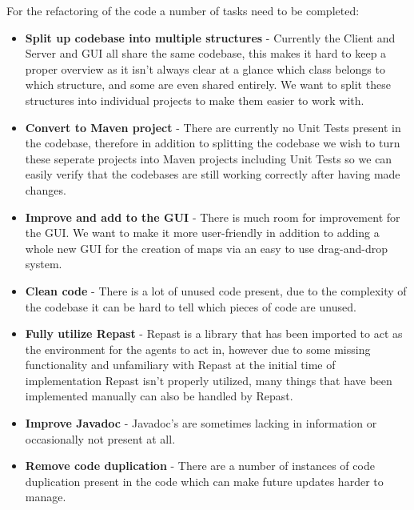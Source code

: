 For the refactoring of the code a number of tasks need to be completed:
\begin{itemize}
\item
\textbf{Split up codebase into multiple structures} - Currently the Client and Server and GUI all share the same codebase, this makes it hard to keep a proper overview as it isn't always clear at a glance which class belongs to which structure, and some are even shared entirely. We want to split these structures into individual projects to make them easier to work with.
\item
\textbf{Convert to Maven project} - There are currently no Unit Tests present in the codebase, therefore in addition to splitting the codebase we wish to turn these seperate projects into Maven projects including Unit Tests so we can easily verify that the codebases are still working correctly after having made changes.
\item
\textbf{Improve and add to the GUI} - There is much room for improvement for the GUI. We want to make it more user-friendly in addition to adding a whole new GUI for the creation of maps via an easy to use drag-and-drop system.
\item
\textbf{Clean code} - There is a lot of unused code present, due to the complexity of the codebase it can be hard to tell which pieces of code are unused.
\item
\textbf{Fully utilize Repast} - Repast is a library that has been imported to act as the environment for the agents to act in, however due to some missing functionality and unfamiliary with Repast at the initial time of implementation Repast isn't properly utilized, many things that have been implemented manually can also be handled by Repast.
\item
\textbf{Improve Javadoc} - Javadoc's are sometimes lacking in information or occasionally not present at all.
\item
\textbf{Remove code duplication} - There are a number of instances of code duplication present in the code which can make future updates harder to manage.
\end{itemize}
